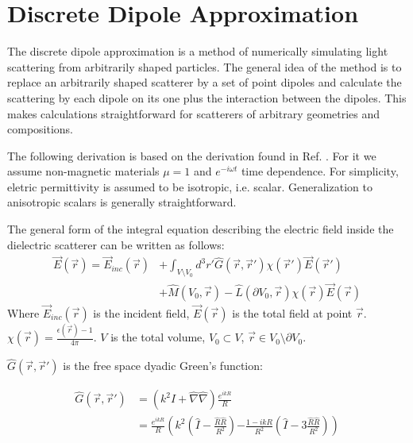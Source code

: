 
\section{Discrete Dipole Approximation}
\label{ap:DDA}

    The discrete dipole approximation is a method of numerically simulating light scattering from arbitrarily shaped particles.
    The general idea of the method is to replace an arbitrarily shaped scatterer by a set of point dipoles and calculate the
    scattering by each dipole on its one plus the interaction between the dipoles. This makes calculations straightforward
    for scatterers of arbitrary geometries and compositions.

    The following derivation is based on the derivation found in Ref. \cite{yurkin2007discrete}. For it we assume
    non-magnetic materials $\mu = 1$ and $e^{-i\omega t}$ time dependence. For simplicity, eletric permittivity is assumed
    to be isotropic, i.e. scalar. Generalization to anisotropic scalars is generally straightforward.

    The general form of the integral equation describing the electric field inside the dielectric scatterer can be written as follows:
    \begin{align}
        \vec{E}(\vec{r}) = \vec{E}_{inc}(\vec{r}) &+ \int_{V \setminus V_0}d^3r' \hat{G}(\vec{r}, \vec{r}')\chi(\vec{r}')\vec{E}(\vec{r}')\nonumber\\
                        &+ \hat{M}(V_0, \vec{r}) - \hat{L}(\partial V_0, \vec{r})\chi(\vec{r})\vec{E}(\vec{r})
    \end{align}
    Where $\vec{E}_{inc}(\vec{r})$ is the incident field, $\vec{E}(\vec{r})$ is the total field at point $\vec{r}$.
    $\chi(\vec{r}) = \frac{\epsilon(\vec{r}) - 1}{4\pi}$. $V$ is the total volume, $V_0 \subset V$, $\vec{r} \in V_0\setminus \partial V_0$.

    $\hat{G}(\vec{r}, \vec{r}')$ is the free space dyadic Green's function:

    \begin{align}
        \hat{G}(\vec{r}, \vec{r}') &= \left(k^2\hat{I}+\hat{\nabla}\hat{\nabla}\right)\frac{e^{ikR}}{R} \\
                                    &= \frac{e^{ikR}}{R}\left(k^2\left(\hat{I}-\frac{\hat{R}\hat{R}}{R^2}\right)\right.
                                        \left.-\frac{1-ikR}{R^2}\left(\hat{I} -3 \frac{\hat{R}\hat{R}}{R^2}\right)\right)
    \end{align}


